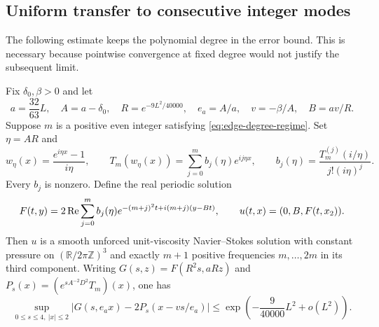 \subsection{Uniform transfer to consecutive integer modes}

The following estimate keeps the polynomial degree in the error bound.
This is necessary because pointwise convergence at fixed degree would
not justify the subsequent limit.

\begin{proposition}\label{prop:dynamic-confluence}
Fix $\delta_0,\beta>0$ and let
\begin{equation}\label{eq:parabolic-frozen-parameters}
 a=\frac{32}{63}L,\quad A=a-\delta_0,\quad
 R=e^{-9L^2/40000},\quad e_a=A/a,\quad
 v=-\beta/A,\quad B=av/R.
\end{equation}
Suppose $m$ is a positive even integer satisfying
\eqref{eq:edge-degree-regime}.  Set $\eta=AR$ and
\begin{equation}\label{eq:parabolic-fourier-coefficients}
 w_\eta(x)=\frac{e^{i\eta x}-1}{i\eta},\qquad
 T_m(w_\eta(x))=\sum_{j=0}^m b_j(\eta)e^{ij\eta x},\qquad
 b_j(\eta)=\frac{T_m^{(j)}(i/\eta)}{j!(i\eta)^j}.
\end{equation}
Every $b_j$ is nonzero.  Define the real periodic solution
\begin{equation}\label{eq:parabolic-exact-shear}
 F(t,y)=2\operatorname{Re}\sum_{j=0}^m b_j(\eta)
 e^{-(m+j)^2t+i(m+j)(y-Bt)},\qquad
 u(t,x)=(0,B,F(t,x_2)).
\end{equation}
Then $u$ is a smooth unforced unit-viscosity Navier--Stokes solution with constant
pressure on $(\mathbb R/2\pi\mathbb Z)^3$ and exactly $m+1$ positive
frequencies $m,\ldots,2m$ in its third component.
Writing $G(s,z)=F(R^2s,aRz)$ and
$P_s(x)=(e^{sA^{-2}D^2}T_m)(x)$, one has
\begin{equation}\label{eq:parabolic-uniform-transfer}
 \sup_{0\le s\le4,\ |x|\le2}
 \left|G(s,e_ax)-2P_s(x-vs/e_a)\right|
 \le \exp\!\left(-\frac9{40000}L^2+o(L^2)\right).
\end{equation}
\end{proposition}

